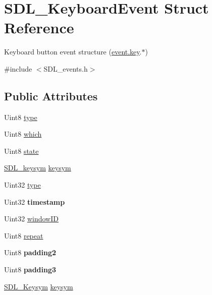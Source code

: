 \hypertarget{structSDL__KeyboardEvent}{\section{S\+D\+L\+\_\+\+Keyboard\+Event Struct Reference}
\label{structSDL__KeyboardEvent}
}


Keyboard button event structure (\hyperlink{unionSDL__Event_ab99927835cc77a9b6bb50b419b4a27df}{event.\+key}.$\ast$)  




{\ttfamily \#include $<$S\+D\+L\+\_\+events.\+h$>$}

\subsection*{Public Attributes}
\begin{DoxyCompactItemize}
\item 
Uint8 \hyperlink{structSDL__KeyboardEvent_ae0b2f2aace6f80c1f47e5a14350d409a}{type}
\item 
Uint8 \hyperlink{structSDL__KeyboardEvent_acb25972bab6a9f142de5652530857b9b}{which}
\item 
Uint8 \hyperlink{structSDL__KeyboardEvent_a110558eb96c113c86cfa31a7018c2346}{state}
\item 
\hyperlink{structSDL__keysym}{S\+D\+L\+\_\+keysym} \hyperlink{structSDL__KeyboardEvent_a2a57ba820a298f2c02ad5d41fd2b1aa8}{keysym}
\item 
Uint32 \hyperlink{structSDL__KeyboardEvent_ae0b2f2aace6f80c1f47e5a14350d409a}{type}
\item 
\hypertarget{structSDL__KeyboardEvent_a3da1d8f6892e7f6ee28d9eafdb5e7d02}{Uint32 {\bfseries timestamp}}\label{structSDL__KeyboardEvent_a3da1d8f6892e7f6ee28d9eafdb5e7d02}

\item 
Uint32 \hyperlink{structSDL__KeyboardEvent_a56efb6780b96acd5b50d8f797efb3546}{window\+I\+D}
\item 
Uint8 \hyperlink{structSDL__KeyboardEvent_a3edac3b36304812d533795c9df4ed4c1}{repeat}
\item 
\hypertarget{structSDL__KeyboardEvent_ae270122f757f76171318294afd2c95e6}{Uint8 {\bfseries padding2}}\label{structSDL__KeyboardEvent_ae270122f757f76171318294afd2c95e6}

\item 
\hypertarget{structSDL__KeyboardEvent_ae1831035ef556a7b09efcd2469f26f7a}{Uint8 {\bfseries padding3}}\label{structSDL__KeyboardEvent_ae1831035ef556a7b09efcd2469f26f7a}

\item 
\hyperlink{structSDL__Keysym}{S\+D\+L\+\_\+\+Keysym} \hyperlink{structSDL__KeyboardEvent_a2a57ba820a298f2c02ad5d41fd2b1aa8}{keysym}
\end{DoxyCompactItemize}


